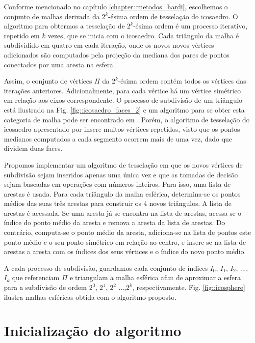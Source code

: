 Conforme mencionado no capítulo \ref{chapter::metodos_hardi}, escolhemos o conjunto de malhas derivada da $2^k$-ésima ordem de tesselação do icosaedro. O algoritmo para obtermos a tesselação de $2^k$-ésima ordem é um processo iterativo, repetido em $k$ vezes, que se inicia com o icosaedro. Cada triângulo da malha é subdividido em quatro em cada iteração, onde os novos novos vértices adicionados são computados pela projeção da mediana dos pares de pontos conectados por uma aresta na esfera.

Assim, o conjunto de vértices $\Pi$ da $2^k$-ésima ordem contém todos os vértices das iterações anteriores. Adicionalmente, para cada vértice há um vértice simétrico em relação aos eixos correspondente. O processo de subdivisão de um triângulo está ilustrado na Fig. \ref{fig::icosaedro_faces_2} e um algoritmo para se obter esta categoria de malha pode ser encontrado em . Porém, o algoritmo de tesselação do icosaedro apresentado por  insere muitos vértices repetidos, visto que os pontos medianos computados a cada segmento ocorrem mais de uma vez, dado que dividem duas faces.


Propomos implementar um algoritmo de tesselação em que os novos vértices de subdivisão sejam inseridos apenas uma única vez e que as tomadas de decisão sejam baseadas em operações com números inteiros. Para isso, uma lista de arestas é usada. Para cada triângulo da malha esférica, determina-se os pontos médios das suas três arestas para construir os 4 novos triângulos. A lista de arestas é acessada. Se uma aresta já se encontra na lista de arestas, acessa-se o índice do ponto médio da aresta e remova a aresta da lista de arestas. Do contrário, computa-se o ponto médio da aresta, adiciona-se na lista de pontos este ponto médio e o seu ponto simétrico em relação ao centro, e insere-se na lista de arestas a aresta com os índices dos seus vértices e o índice do novo ponto médio.

A cada processo de subdivisão, guardamos cada conjunto de índices $I_0$, $I_1$, $I_2$, ..., $I_k$ que referenciam $\Pi$ e triangulam a malha esférica afim de aproximar a esfera para a subdivisão de ordem $2^0$, $2^1$, $2^2$ ...,$2^k$, respectivamente. Fig. \ref{fig::icosphere} ilustra malhas esféricas obtida com o algoritmo proposto.

\section{Inicialização do algoritmo}
\label{sec::inicialização_do_algoritmo}

